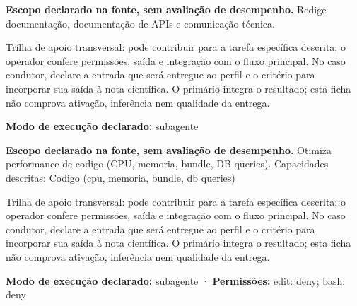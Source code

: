 
\begin{descricao}
\textbf{Escopo declarado na fonte, sem avaliação de desempenho.}
Redige documentação, documentação de APIs e comunicação técnica.
\end{descricao}

\begin{funcao}
Trilha de apoio transversal: pode contribuir para a tarefa específica descrita; o operador confere permissões, saída e integração com o fluxo principal. No caso condutor, declare a entrada que será entregue ao perfil e o critério para incorporar sua saída à nota científica. O primário integra o resultado; esta ficha não comprova ativação, inferência nem qualidade da entrega.
\end{funcao}

\begin{arquitetura}
\textbf{Modo de execução declarado:} subagente
\end{arquitetura}


\begin{descricao}
\textbf{Escopo declarado na fonte, sem avaliação de desempenho.}
Otimiza performance de codigo (CPU, memoria, bundle, DB queries). Capacidades descritas: Codigo (cpu, memoria, bundle, db queries)
\end{descricao}

\begin{funcao}
Trilha de apoio transversal: pode contribuir para a tarefa específica descrita; o operador confere permissões, saída e integração com o fluxo principal. No caso condutor, declare a entrada que será entregue ao perfil e o critério para incorporar sua saída à nota científica. O primário integra o resultado; esta ficha não comprova ativação, inferência nem qualidade da entrega.
\end{funcao}

\begin{arquitetura}
\textbf{Modo de execução declarado:} subagente · \textbf{Permissões:} edit: deny; bash: deny
\end{arquitetura}

